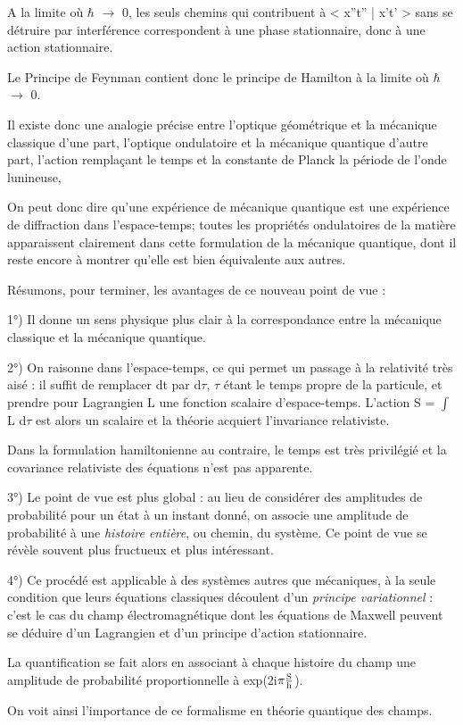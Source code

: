 A la limite où $\hbar$ $\to$ 0, les seuls chemins qui contribuent à
< x''t'' | x't' > sans se détruire par interférence correspondent à une
phase stationnaire, donc à une action stationnaire.

Le Principe de Feynman contient donc le principe de Hamilton
à la limite où $\hbar$ $\to$ 0.

Il existe donc une analogie précise entre l'optique géométrique
et la mécanique classique d'une part, l'optique ondulatoire et la mécanique quantique d'autre part,
l'action remplaçant le temps et la constante
de Planck la période de l'onde lunineuse,

On peut donc dire qu'une expérience de mécanique quantique est
une expérience de diffraction dans l'espace-temps; toutes les propriétés
ondulatoires de la matière apparaissent clairement dans cette formulation
de la mécanique quantique, dont il reste encore à montrer qu'elle est
bien équivalente aux autres.

Résumons, pour terminer, les avantages de ce nouveau point de vue :

1°) Il donne un sens physique plus clair à la correspondance
entre la mécanique classique et la mécanique quantique.

2°) On raisonne dans l'espace-temps, ce qui permet un passage
à la relativité très aisé : il suffit de remplacer dt par d$\tau$, $\tau$ étant le
temps propre de la particule, et prendre pour Lagrangien L une fonction
scalaire d'espace-temps. L'action S = $\int$ L d$\tau$ est alors un scalaire et la
théorie acquiert l'invariance relativiste.

Dans la formulation hamiltonienne au contraire, le temps
est très privilégié et la covariance relativiste des équations n'est pas
apparente.

3°) Le point de vue est plus global : au lieu de considérer des
amplitudes de probabilité pour un état à un instant donné, on associe une
amplitude de probabilité à une {\it histoire entière}, ou chemin, du système.
Ce point de vue se révèle souvent plus fructueux et plus intéressant.

4°) Ce procédé est applicable à des systèmes autres que mécaniques,
à la seule condition que leurs équations classiques découlent d'un
{\it principe variationnel} : c'est le cas du champ électromagnétique dont les
équations de Maxwell peuvent se déduire d'un Lagrangien et d'un principe
d'action stationnaire.

La quantification se fait alors en associant à chaque histoire
du champ une amplitude de probabilité proportionnelle à exp(2i$\pi \frac{\text{S}}{\text{h}}$).

On voit ainsi l'importance de ce formalisme en théorie quantique
des champs.
